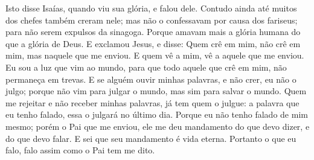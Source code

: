 {Isto disse Isaías, quando viu sua glória, e falou dele.
Contudo ainda até muitos dos chefes também creram nele; mas não o confessavam por causa dos fariseus; para não serem expulsos da sinagoga.
Porque amavam mais a glória humana do que a glória de Deus.
E exclamou Jesus, e disse: Quem crê em mim, não crê
{} em mim, mas
{} naquele que me enviou.
E quem vê a mim, vê a aquele que me enviou.
Eu sou a luz que vim ao mundo, para que todo aquele que crê em mim, não permaneça em trevas.
E se alguém ouvir minhas palavras, e não crer, eu não o julgo; porque não vim para julgar o mundo, mas sim para salvar o mundo.
Quem me rejeitar e não receber minhas palavras, já tem quem o julgue: a palavra que eu tenho falado, essa o julgará no último dia.
Porque eu não tenho falado de mim mesmo; porém o Pai que me enviou, ele me deu mandamento do que devo dizer, e do que devo falar.
E sei que seu mandamento é vida eterna. Portanto o que eu falo, falo assim como o Pai tem me dito.

}
